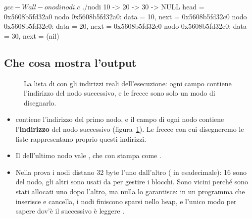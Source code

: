 \begin{console}
$ gcc -Wall -o nodi nodi.c
$ ./nodi
10 -> 20 -> 30 -> NULL
head = 0x5608b5fd32a0
nodo 0x5608b5fd32a0: data = 10, next = 0x5608b5fd32c0
nodo 0x5608b5fd32c0: data = 20, next = 0x5608b5fd32e0
nodo 0x5608b5fd32e0: data = 30, next = (nil)
\end{console}

\subsection{Che cosa mostra l'output}

\begin{figure}[H]
  \centering
  \caption{La lista di  con gli indirizzi reali dell'esecuzione:
           ogni campo  contiene l'indirizzo del nodo successivo, e
           le frecce sono solo un modo di disegnarlo.}
  \label{fig:nodi}
\end{figure}

\begin{itemize}
  \item {} contiene l'indirizzo del primo nodo, e il campo
         di ogni nodo contiene l'\textbf{indirizzo} del nodo
        successivo (figura~\ref{fig:nodi}). Le frecce con cui disegneremo
        le liste rappresentano proprio questi indirizzi.
  \item Il  dell'ultimo nodo vale , che 
        con  stampa come .
  \item Nella prova i nodi distano 32 byte l'uno dall'altro ( in
        esadecimale): 16 sono del nodo, gli altri sono usati da
         per gestire i blocchi. Sono vicini perché sono stati
        allocati uno dopo l'altro, ma nulla lo garantisce: in un programma
        che inserisce e cancella, i nodi finiscono sparsi nello heap, e
        l'unico modo per sapere dov'è il successivo è leggere .
\end{itemize}

